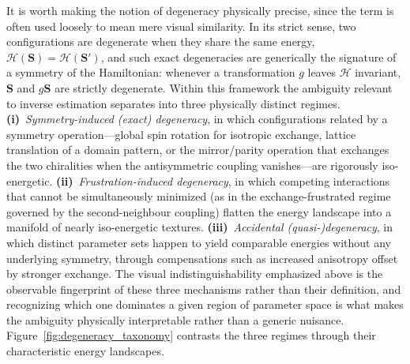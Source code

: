 \documentclass[letterpaper, 12, one column]{article}
\begin{document}
It is worth making the notion of degeneracy physically precise, since the term is often used loosely to mean mere visual similarity. In its strict sense, two configurations are degenerate when they share the same energy, $\mathcal{H}(\mathbf{S})=\mathcal{H}(\mathbf{S}')$, and such exact degeneracies are generically the signature of a symmetry of the Hamiltonian: whenever a transformation $g$ leaves $\mathcal{H}$ invariant, $\mathbf{S}$ and $g\mathbf{S}$ are strictly degenerate. Within this framework the ambiguity relevant to inverse estimation separates into three physically distinct regimes. \textbf{(i)}~\emph{Symmetry-induced (exact) degeneracy}, in which configurations related by a symmetry operation—global spin rotation for isotropic exchange, lattice translation of a domain pattern, or the mirror/parity operation that exchanges the two chiralities when the antisymmetric coupling vanishes—are rigorously iso-energetic. \textbf{(ii)}~\emph{Frustration-induced degeneracy}, in which competing interactions that cannot be simultaneously minimized (as in the exchange-frustrated regime governed by the second-neighbour coupling) flatten the energy landscape into a manifold of nearly iso-energetic textures. \textbf{(iii)}~\emph{Accidental (quasi-)degeneracy}, in which distinct parameter sets happen to yield comparable energies without any underlying symmetry, through compensations such as increased anisotropy offset by stronger exchange. The visual indistinguishability emphasized above is the observable fingerprint of these three mechanisms rather than their definition, and recognizing which one dominates a given region of parameter space is what makes the ambiguity physically interpretable rather than a generic nuisance. Figure~\ref{fig:degeneracy_taxonomy} contrasts the three regimes through their characteristic energy landscapes.
\end{document}
